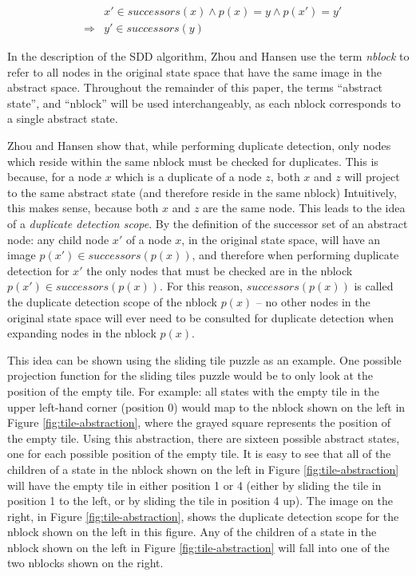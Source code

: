 \documentclass{article}
\begin{document}
\begin{eqnarray*}
  &&x' \in successors(x) \wedge p(x) = y \wedge p(x') = y' \\
  &\Rightarrow& y' \in successors(y)
\end{eqnarray*}

In the description of the SDD algorithm, Zhou and Hansen use the term
\emph{nblock} to refer to all nodes in the original state space that
have the same image in the abstract space.  Throughout the remainder
of this paper, the terms ``abstract state'', and ``nblock'' will be
used interchangeably, as each nblock corresponds to a single abstract
state.

Zhou and Hansen show that, while performing duplicate detection, only
nodes which reside within the same nblock must be checked for
duplicates.  This is because, for a node $x$ which is a duplicate of a
node $z$, both $x$ and $z$ will project to the same abstract state
(and therefore reside in the same nblock) Intuitively, this makes
sense, because both $x$ and $z$ are the same node.  This leads to the
idea of a \emph{duplicate detection scope}.  By the definition of the
successor set of an abstract node: any child node $x'$ of a node $x$,
in the original state space, will have an image $p(x') \in
successors(p(x))$, and therefore when performing duplicate detection
for $x'$ the only nodes that must be checked are in the nblock $p(x')
\in successors(p(x))$.  For this reason, $successors(p(x))$ is called
the duplicate detection scope of the nblock $p(x)$ -- no other nodes
in the original state space will ever need to be consulted for
duplicate detection when expanding nodes in the nblock $p(x)$.

This idea can be shown using the sliding tile puzzle as an example.
One possible projection function for the sliding tiles puzzle would be
to only look at the position of the empty tile.  For example: all
states with the empty tile in the upper left-hand corner (position 0)
would map to the nblock shown on the left in Figure
\ref{fig:tile-abstraction}, where the grayed square represents the
position of the empty tile.  Using this abstraction, there are sixteen
possible abstract states, one for each possible position of the empty
tile.  It is easy to see that all of the children of a state in the
nblock shown on the left in Figure \ref{fig:tile-abstraction} will
have the empty tile in either position 1 or 4 (either by sliding the
tile in position 1 to the left, or by sliding the tile in position 4
up).  The image on the right, in Figure \ref{fig:tile-abstraction},
shows the duplicate detection scope for the nblock shown on the left
in this figure.  Any of the children of a state in the nblock shown on
the left in Figure \ref{fig:tile-abstraction} will fall into one of
the two nblocks shown on the right.
\end{document}

